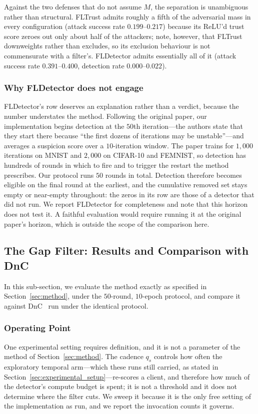 \documentclass[journal]{IEEEtran}
\begin{document}
Against the two defenses that do not assume $M$, the separation is unambiguous rather than
structural. FLTrust admits roughly a fifth of the adversarial mass in every configuration
(attack success rate $0.199$--$0.217$) because its ReLU'd trust score zeroes out only about
half of the attackers; note, however, that FLTrust downweights rather than excludes, so its
exclusion behaviour is not commensurate with a filter's. FLDetector admits essentially all
of it (attack success rate $0.391$--$0.400$, detection rate $0.000$--$0.022$).

\subsubsection{Why FLDetector does not engage}
FLDetector's row deserves an explanation rather than a verdict, because the number understates
the method. Following the original paper, our implementation begins detection at the $50$th
iteration---the authors state that they start there because ``the first dozens of iterations
may be unstable''---and averages a suspicion score over a $10$-iteration window. The paper
trains for $1{,}000$ iterations on MNIST and $2{,}000$ on CIFAR-10 and FEMNIST, so detection
has hundreds of rounds in which to fire and to trigger the restart the method prescribes. Our
protocol runs $50$ rounds in total. Detection therefore becomes eligible on the final round
at the earliest, and the cumulative removed set stays empty or near-empty throughout: the
zeros in its row are those of a detector that did not run.
We report FLDetector for completeness and note that this horizon does not test it. A
faithful evaluation would require running it at the original paper's horizon, which is
outside the scope of the comparison here.


\subsection{The Gap Filter: Results and Comparison with DnC}
\label{sec:af_results}

In this sub-section, we evaluate the method exactly as specified in Section~\ref{sec:method}, under the $50$-round, $10$-epoch protocol, and compare it against DnC~\cite{shejwalkar2021manipulating} run under the identical protocol.

\subsubsection{Operating Point}
One experimental setting requires definition, and it is not a parameter of the method of Section~\ref{sec:method}. The cadence $q_s$ controls how often the exploratory temporal arm---which these runs still carried, as stated in Section~\ref{sec:experimental_setup}---re-scores a client, and therefore how much of the detector's compute budget is spent; it is not a threshold and it does not determine where the filter cuts. We sweep it because it is the only free setting of the implementation as run, and we report the invocation counts it governs.
\end{document}
